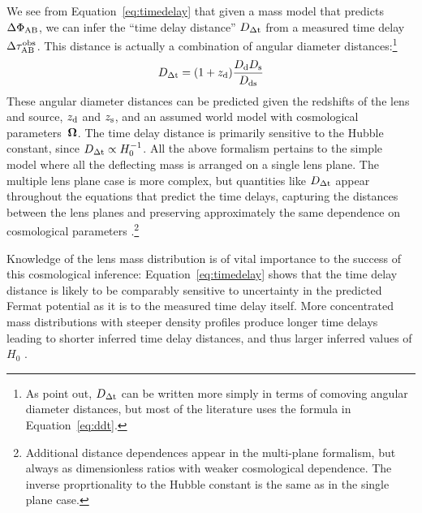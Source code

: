 
We see from Equation~\ref{eq:timedelay} that given a mass
model that predicts $\Delta \Phi_{\rm AB}$, we can infer the ``time
delay distance'' $D_{\Delta{\rm t}}$ from a measured time delay $\Delta \tau_{\rm AB}^{\rm obs}$.
This distance is actually a combination of angular diameter
distances:\footnote{As \citet{SKW06} point out, $D_{\Delta{\rm t}}$ can be written more simply in terms
of comoving angular diameter distances, but most of the literature uses the
formula in Equation~\ref{eq:ddt}.}
%
\begin{equation}
    D_{\Delta{\rm t}} = (1+z_{\rm d}) \frac{D_{\rm d} D_{\rm s}}{D_{\rm ds}}  \label{eq:ddt}
\end{equation}
%
These angular diameter distances can be predicted given the redshifts
of the lens and source, $z_{\rm d}$ and $z_{\rm s}$, and an assumed world model with
cosmological parameters~$\boldsymbol{\Omega}$. The time delay distance is primarily
sensitive to the Hubble constant, since $D_{\Delta{\rm t}} \propto H_0^{-1}$.
All the above formalism pertains to the simple model where
all the deflecting mass is arranged on a single lens plane. The multiple
lens plane case is more complex, but quantities like $D_{\Delta{\rm t}}$ appear
throughout the equations that predict the time delays, capturing the
distances between the lens planes and preserving approximately the
same dependence on cosmological parameters \citep{Petters2001,McCullyEtal2014}.\footnote{Additional
distance dependences appear in the multi-plane formalism, but always as dimensionless
ratios with weaker cosmological dependence. The inverse proprtionality
to the Hubble constant is the same as in the single plane case.}


Knowledge of the lens mass distribution is of vital importance to the
success of this cosmological inference: Equation~\ref{eq:timedelay}
shows that the time delay distance is likely to be comparably
sensitive to uncertainty in
the predicted Fermat potential as it is to the measured time delay itself.
More concentrated mass distributions with steeper density
profiles produce longer time delays leading to shorter inferred time
delay distances, and thus larger inferred values of $H_0$ \citep{Wuc02,Koc02,Suyu12}.


